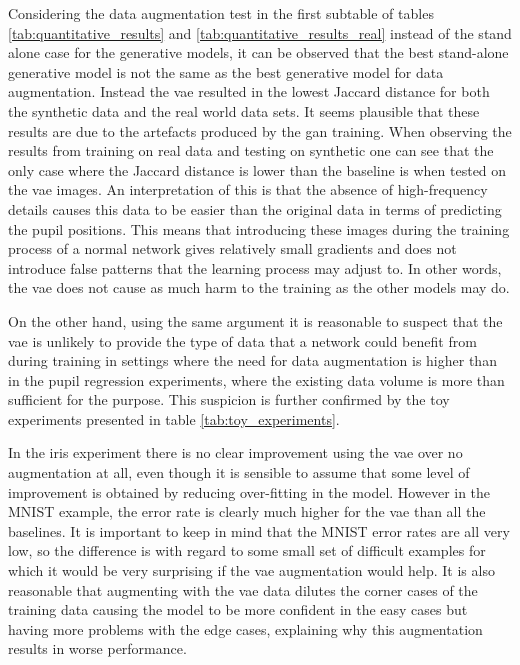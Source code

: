 Considering the data augmentation test in the first subtable of tables \ref{tab:quantitative_results} and \ref{tab:quantitative_results_real} instead of the stand alone case for the generative models, it can be observed that the best stand-alone generative model is not the same as the best generative model for data augmentation. Instead the \acrshort{vae} resulted in the lowest Jaccard distance for both the synthetic data and the real world data sets. It seems plausible that these results are due to the artefacts produced by the \acrshort{gan} training. When observing the results from training on real data and testing on synthetic one can see that the only case where the Jaccard distance is lower than the baseline is when tested on the \acrshort{vae} images. An interpretation of this is that the absence of high-frequency details causes this data to be easier than the original data in terms of predicting the pupil positions. This means that introducing these images during the training process of a normal network gives relatively small gradients and does not introduce false patterns that the learning process may adjust to. In other words, the \acrshort{vae} does not cause as much harm to the training as the other models may do. 

On the other hand, using the same argument it is reasonable to suspect that the \acrshort{vae} is unlikely to provide the type of data that a network could benefit from during training in settings where the need for data augmentation is higher than in the pupil regression experiments, where the existing data volume is more than sufficient for the purpose. This suspicion is further confirmed by the toy experiments presented in table \ref{tab:toy_experiments}. 

In the iris experiment there is no clear improvement using the \acrshort{vae} over no augmentation at all, even though it is sensible to assume that some level of improvement is obtained by reducing over-fitting in the model. However in the MNIST example, the error rate is clearly much higher for the \acrshort{vae} than all the baselines. It is important to keep in mind that the MNIST error rates are all very low, so the difference is with regard to some small set of difficult examples for which it would be very surprising if the \acrshort{vae} augmentation would help. It is also reasonable that augmenting with the \acrshort{vae} data dilutes the corner cases of the training data causing the model to be more confident in the easy cases but having more problems with the edge cases, explaining why this augmentation results in worse performance.

